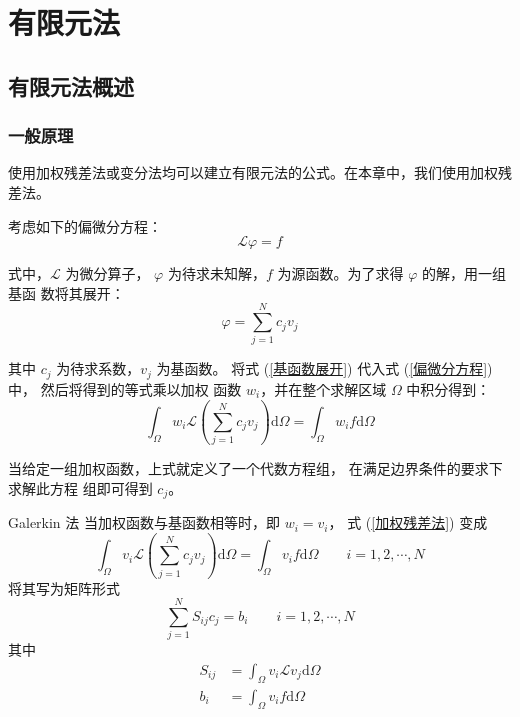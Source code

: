\chapter{有限元法}

\section{有限元法概述}

\subsection{一般原理}

\par 使用加权残差法或变分法均可以建立有限元法的公式。在本章中，我们使用加权残
差法。

\par 考虑如下的偏微分方程：
\begin{equation}
    \mathcal{L}\varphi = f
    \label{偏微分方程}
\end{equation}
\par 式中，$\mathcal{L}$ 为微分算子，
$\varphi$ 为待求未知解，$f$ 为源函数。为了求得 $\varphi$ 的解，用一组基函
数将其展开：
\begin{equation}
    \varphi = \sum_{j=1}^{N} c_j v_j
    \label{基函数展开}
\end{equation}
\par 其中 $c_j$ 为待求系数，$v_j$ 为基函数。
将式 (\ref{基函数展开}) 代入式 (\ref{偏微分方程}) 中，
然后将得到的等式乘以加权
函数 $w_i$，并在整个求解区域 $\Omega$ 中积分得到：
\begin{equation}
    \int_{\Omega} w_i \mathcal{L}\left(\sum_{j=1}^{N} c_j v_j\right)
     \text{d}\Omega = \int_{\Omega} w_i f \text{d}\Omega
    \label{加权残差法}
\end{equation}
\par 当给定一组加权函数，上式就定义了一个代数方程组，
在满足边界条件的要求下求解此方程
组即可得到 $c_j$。

\begin{theorem}{Galerkin 法}
    当加权函数与基函数相等时，即 $w_i = v_i$，
    式 (\ref{加权残差法}) 变成
    \begin{equation}
        \int_{\Omega} v_i \mathcal{L}\left(\sum_{j=1}^{N} c_j v_j\right)
        \text{d}\Omega = \int_{\Omega} v_i f \text{d}\Omega
        \qquad i = 1, 2, \cdots, N
    \end{equation}
    将其写为矩阵形式
    \begin{equation}
        \sum_{j=1}^{N} S_{ij} c_j = b_i \qquad i = 1, 2, \cdots, N
    \end{equation}
    其中
    \begin{align}
        S_{ij} &= \int_{\Omega} v_i \mathcal{L} v_j \text{d}\Omega \\
        b_i &= \int_{\Omega} v_i f \text{d}\Omega
    \end{align}
\end{theorem}


